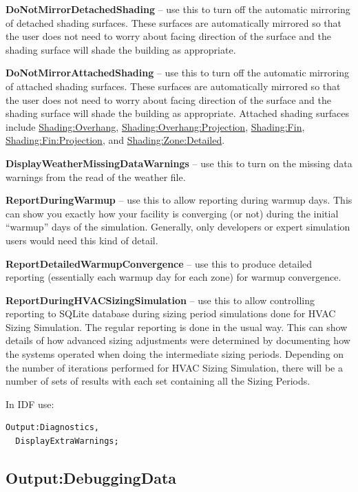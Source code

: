 \textbf{DoNotMirrorDetachedShading} -- use this to turn off the automatic mirroring of detached shading surfaces. These surfaces are automatically mirrored so that the user does not need to worry about facing direction of the surface and the shading surface will shade the building as appropriate.

\textbf{DoNotMirrorAttachedShading} -- use this to turn off the automatic mirroring of attached shading surfaces. These surfaces are automatically mirrored so that the user does not need to worry about facing direction of the surface and the shading surface will shade the building as appropriate. Attached shading surfaces include \hyperref[shadingoverhang]{Shading:Overhang}, \hyperref[shadingoverhangprojection]{Shading:Overhang:Projection}, \hyperref[shadingfin]{Shading:Fin}, \hyperref[shadingfinprojection]{Shading:Fin:Projection}, and \hyperref[shadingzonedetailed-000]{Shading:Zone:Detailed}.

\textbf{DisplayWeatherMissingDataWarnings} -- use this to turn on the missing data warnings from the read of the weather file.

\textbf{ReportDuringWarmup} -- use this to allow reporting during warmup days. This can show you exactly how your facility is converging (or not) during the initial ``warmup'' days of the simulation. Generally, only developers or expert simulation users would need this kind of detail.

\textbf{ReportDetailedWarmupConvergence} -- use this to produce detailed reporting (essentially each warmup day for each zone) for warmup convergence.

\textbf{ReportDuringHVACSizingSimulation} -- use this to allow controlling reporting to SQLite database during sizing period simulations done for HVAC Sizing Simulation. The regular reporting is done in the usual way. This can show details of how advanced sizing adjustments were determined by documenting how the systems operated when doing the intermediate sizing periods. Depending on the number of iterations performed for HVAC Sizing Simulation, there will be a number of sets of results with each set containing all the Sizing Periods.

In IDF use:

\begin{lstlisting}
Output:Diagnostics,
  DisplayExtraWarnings;
\end{lstlisting}

\subsection{Output:DebuggingData}\label{outputdebuggingdata}

